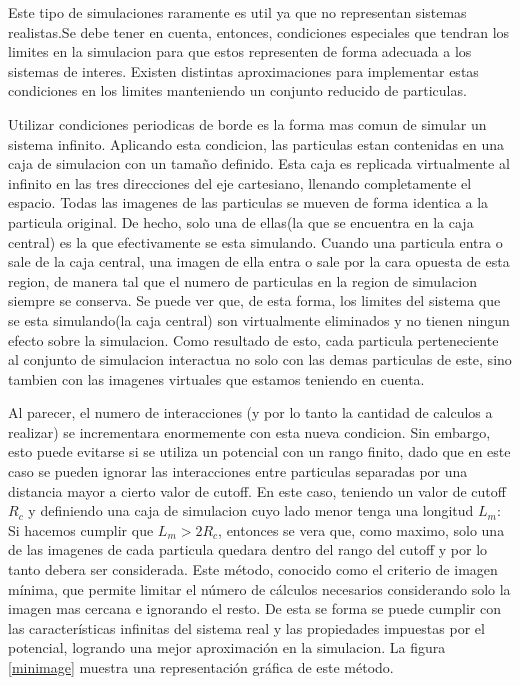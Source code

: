 \documentclass[a4paper,10pt]{report}
\begin{document}
Este tipo de simulaciones raramente es util ya que no representan sistemas realistas.Se debe tener en cuenta, entonces, condiciones especiales que tendran los limites en la simulacion para que estos representen de forma adecuada a los sistemas de interes.
Existen distintas aproximaciones para implementar estas condiciones en los limites manteniendo un conjunto reducido de particulas. 

Utilizar condiciones periodicas de borde es la forma mas comun de simular un sistema infinito. Aplicando esta condicion, las particulas estan contenidas en una caja de simulacion con un tamaño definido. 
Esta caja es replicada virtualmente al infinito en las tres direcciones del eje cartesiano, llenando completamente el espacio.
Todas las imagenes de las particulas se mueven de forma identica a la particula original. De hecho, solo una de ellas(la que se encuentra en la caja central) es la que efectivamente se esta simulando.
Cuando una particula entra o sale de la caja central, una imagen de ella entra o sale por la cara opuesta de esta region, de manera tal que el numero de particulas en la region de simulacion siempre se conserva.
Se puede ver que, de esta forma, los limites del sistema que se esta simulando(la caja central) son virtualmente eliminados y no tienen ningun efecto sobre la simulacion.
Como resultado de esto, cada particula perteneciente al conjunto de simulacion interactua no solo con las demas particulas de este, sino tambien con las imagenes virtuales que estamos teniendo en cuenta.

Al parecer, el numero de interacciones (y por lo tanto la cantidad de calculos a realizar) se incrementara enormemente con esta nueva condicion. 
Sin embargo, esto puede evitarse si se utiliza un potencial con un rango finito, dado que en este caso se pueden ignorar las interacciones entre particulas separadas por una distancia mayor a cierto valor de cutoff.
En este caso, teniendo un valor de cutoff $R_{c}$ y definiendo una caja de simulacion cuyo lado menor tenga una longitud $L_m$: 
Si hacemos cumplir que $L_m>2R_{c}$, entonces se vera que, como maximo, solo una de las imagenes de cada particula quedara dentro del rango del cutoff y por lo tanto debera ser considerada.
Este método, conocido como el criterio de imagen mínima, que permite limitar el número de cálculos necesarios considerando solo la imagen mas cercana e ignorando el resto. 
De esta se forma se puede cumplir con las características infinitas del sistema real y las propiedades impuestas por el potencial, logrando una mejor aproximación en la simulacion.
La figura \ref{minimage} muestra una representación gráfica de este método. 
\end{document}
